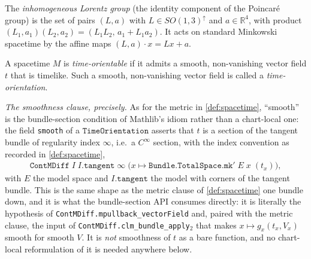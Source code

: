 \begin{definition}
    \label{def:inhomogeneous-lorentz-group}
    \leanok
    The \textit{inhomogeneous Lorentz group} (the identity component of the Poincar\'e group) is the set of pairs $(L, a)$ with $L \in SO(1,3)^{\uparrow}$ and $a \in \mathbb{R}^4$, with product $(L_1, a_1)(L_2, a_2) = (L_1 L_2,\, a_1 + L_1 a_2)$. It acts on standard Minkowski spacetime by the affine maps $(L, a) \cdot x = Lx + a$.
\end{definition}

\begin{definition}
    \label{def:time-orientable}
    \leanok
    A spacetime $M$ is \textit{time-orientable} if it admits a smooth, non-vanishing vector field $t$ that is timelike. Such a smooth, non-vanishing vector field is called a \textit{time-orientation}.

    \emph{The smoothness clause, precisely.} As for the metric in \ref{def:spacetime}, ``smooth'' is the bundle-section condition of Mathlib's idiom rather than a chart-local one: the field \texttt{smooth} of a $\mathtt{TimeOrientation}$ asserts that $t$ is a section of the tangent bundle of regularity index $\infty$, i.e.\ a $C^\infty$ section, with the index convention as recorded in \ref{def:spacetime},
    \begin{align}
        \mathtt{ContMDiff}\;I\;I.\mathtt{tangent}\;\infty\;\Big(x \mapsto \mathtt{Bundle.TotalSpace.mk'}\;E\;x\;(t_x)\Big),
    \end{align}
    with $E$ the model space and $I.\mathtt{tangent}$ the model with corners of the tangent bundle. This is the same shape as the metric clause of \ref{def:spacetime} one bundle down, and it is what the bundle-section API consumes directly: it is literally the hypothesis of \texttt{ContMDiff.mpullback\_vectorField} and, paired with the metric clause, the input of \texttt{ContMDiff.clm\_bundle\_apply\ensuremath{_2}} that makes $x \mapsto g_x(t_x, V_x)$ smooth for smooth $V$. It is \emph{not} smoothness of $t$ as a bare function, and no chart-local reformulation of it is needed anywhere below.
\end{definition}

